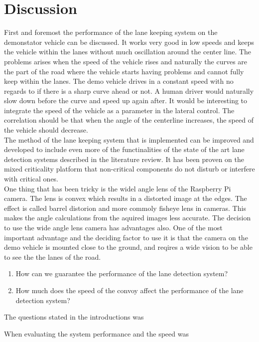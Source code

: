\chapter{Discussion}
First and foremost the performance of the lane keeping system on the demonstator vehicle can be discussed. It works very good in low speeds and keeps the vehicle within the lanes without much oscillation around the center line. The problems arises when the speed of the vehicle rises and naturally the curves are the part of the road where the vehicle starts having problems and cannot fully keep within the lanes. The demo vehicle drives in a constant speed with no regards to if there is a sharp curve ahead or not. A human driver would naturally slow down before the curve and speed up again after. It would be interesting to integrate the speed of the vehicle as a parameter in the lateral control. The correlation should be that when the angle of the centerline increases, the speed of the vehicle should decrease. \\


The method of the lane keeping system that is implemented can be improved and developed to include even more of the functinalities of the state of the art lane detection systems described in the literature review. It has been proven \cite{zaki2016} on the mixed criticality platform that non-critical components do not disturb or interfere with critical ones.\\

One thing that has been tricky is the widel angle lens of the Raspberry Pi camera. The lens is convex which results in a distorted image at the edges. The effect is called barrel distorion and more commoly fisheye lens in cameras. This makes the angle calculations from the aquired images less accurate. The decision to use the wide angle lens camera has advantages also. One of the most important advantage and the deciding factor to use it is that the camera on the demo vehicle is mounted close to the ground, and reqires a wide vision to be able to see the the lanes of the road.\\



\begin{enumerate}  
\item How can we guarantee the performance of the lane detection system?
\item How much does the speed of the convoy affect the performance of the lane detection system?
\end{enumerate}

The questions stated in the introductions was

When evaluating the system performance and the speed was 